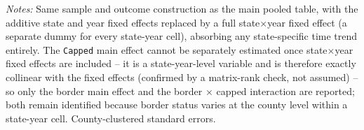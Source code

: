 \begin{table}[htbp]
\centering
\caption{Robustness: main pooled specification with state $\times$ year fixed effects}
\label{tab:stateyear_fe}
\footnotesize
{}
\begin{minipage}{0.98\textwidth}
\vspace{0.3em}
\footnotesize
\textit{Notes:} Same sample and outcome construction as the main pooled table, with the additive state and
year fixed effects replaced by a full state$\times$year fixed effect (a separate dummy for every state-year
cell), absorbing any state-specific time trend entirely. The \texttt{Capped} main effect cannot be separately
estimated once state$\times$year fixed effects are included -- it is a state-year-level variable and is
therefore exactly collinear with the fixed effects (confirmed by a matrix-rank check, not assumed) -- so only
the border main effect and the border $\times$ capped interaction are reported; both remain identified because
border status varies at the county level within a state-year cell. County-clustered standard errors.
\end{minipage}
\end{table}

